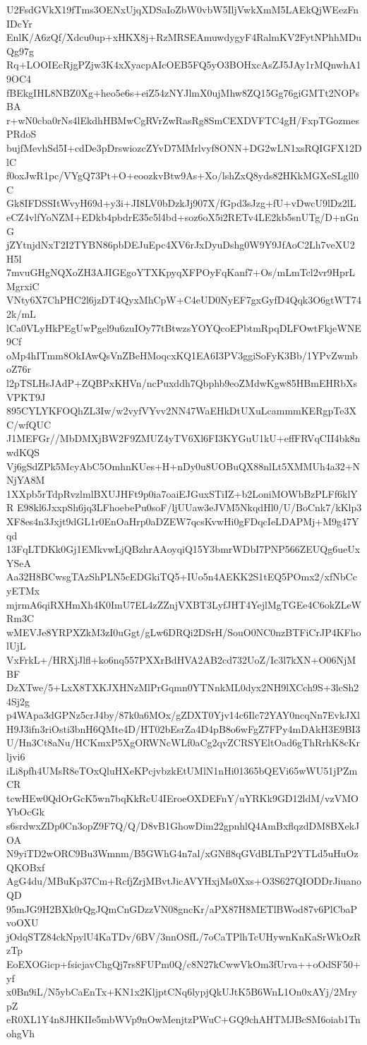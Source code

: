U2FsdGVkX19fTms3OENxUjqXDSaIoZbW0vbW5IljVwkXmM5LAEkQjWEezFnIDcYr
EnlK/A6zQf/Xdcu0up+xHKX8j+RzMRSEAmuwdygyF4RalmKV2FytNPhhMDuQg97g
Rq+LOOIEcRjgPZjw3K4xXyacpAIcOEB5FQ5yO3BOHxcAsZJ5JAy1rMQnwhA19OC4
fBEkgIHL8NBZ0Xg+heo5e6s+eiZ54zNYJlmX0ujMhw8ZQ15Gg76giGMTt2NOPsBA
r+wN0cba0rNs4lEkdhHBMwCgRVrZwRasRg8SmCEXDVFTC4gH/FxpTGozmesPRdoS
bujfMevhSd5I+cdDe3pDrswiozcZYvD7MMrlvyf8ONN+DG2wLN1xsRQIGFX12DlC
f0oxJwR1pc/VYgQ73Pt+O+eoozkvBtw9As+Xo/lshZxQ8yds82HKkMGXeSLgll0C
Gk8IFDSSItWvyH69d+y3i+JI8LV0bDzkJj907X/fGpd3sJzg+fU+vDwcU9lDz2lL
eCZ4vlfYoNZM+EDkb4pbdrE35c5l4bd+soz6oX5i2RETv4LE2kb5snUTg/D+nGnG
jZYtnjdNxT2I2TYBN86pbDEJuEpc4XV6rJxDyuDshg0W9Y9JfAoC2Lh7veXU2H5l
7mvuGHgNQXoZH3AJIGEgoYTXKpyqXFPOyFqKanf7+Os/mLmTcl2vr9HprLMgrxiC
VNty6X7ChPHC2l6jzDT4QyxMhCpW+C4eUD0NyEF7gxGyfD4Qqk3O6gtWT742k/mL
lCa0VLyHkPEgUwPgel9u6zuIOy77tBtwzsYOYQcoEPbtmRpqDLFOwtFkjeWNE9Cf
oMp4hITmm8OkIAwQsVnZBeHMoqcxKQ1EA6I3PV3ggiSoFyK3Bb/1YPvZwmboZ76r
l2pTSLHsJAdP+ZQBPxKHVn/ncPuxddh7Qbphb9eoZMdwKgw85HBmEHRbXsVPKT9J
895CYLYKFOQhZL3Iw/w2vyfVYvv2NN47WaEHkDtUXuLcammmKERgpTe3XC/wfQUC
J1MEFGr//MbDMXjBW2F9ZMUZ4yTV6Xl6FI3KYGuU1kU+effFRVqCII4bk8nwdKQS
Vj6gSdZPk5McyAbC5OmhnKUes+H+nDy0u8UOBuQX88nlLt5XMMUh4a32+NNjYA8M
1XXpb5rTdpRvzlmlBXUJHFt9p0ia7oaiEJGuxSTiIZ+b2LoniMOWbBzPLFf6klYR
E98kl6JxxpSh6jq3LFhoebePu0soF/ljUUaw3eJVM5NkqdHl0/U/BoCnk7/kKlp3
XF8es4n3Jxjt9dGL1r0EnOaHrp0aDZEW7qcsKvwHi0gFDqcIeLDAPMj+M9g47Yqd
13FqLTDKk0Gj1EMkvwLjQBzhrAAoyqiQ15Y3bmrWDbI7PNP566ZEUQg6ueUxYSeA
Aa32H8BCwsgTAzShPLN5cEDGkiTQ5+IUo5n4AEKK2S1tEQ5POmx2/xfNbCcyETMx
mjrmA6qiRXHmXh4K0ImU7EL4zZZnjVXBT3LyfJHT4YejlMgTGEe4C6okZLeWRm3C
wMEVJe8YRPXZkM3zI0uGgt/gLw6DRQi2DSrH/SouO0NC0nzBTFiCrJP4KFholUjL
VxFrkL+/HRXjJlfl+ko6nq557PXXrBdHVA2AB2cd732UoZ/Ic3l7kXN+O06NjMBF
DzXTwe/5+LxX8TXKJXHNzMlPrGqmn0YTNnkML0dyx2NH9lXCch9S+3lcSh24Sj2g
p4WApa3dGPNz5crJ4by/87k0a6MOx/gZDXT0Yjv14c6Ilc72YAY0ncqNn7EvkJXl
H9J3ifn3riOsti3bnH6QMte4D/HT02bEsrZa4D4pB8o6wFgZ7FPy4mDAkH3E9BI3
U/Hn3Ct8aNu/HCKmxP5XgORWNcWLf0aCg2qvZCRSYEltOad6gThRrhK8cKrljvi6
iLi8pfh4UMsR8eTOxQluHXeKPcjvbzkEtUMlN1nHi01365bQEVi65wWU51jPZmCR
tcwHEw0QdOrGcK5wn7bqKkRcU4IEroeOXDEFnY/uYRKk9GD12ldM/vzVMOYbOcGk
s6srdwxZDp0Cn3opZ9F7Q/Q/D8vB1GhowDim22gpnhlQ4AmBxflqzdDM8BXekJOA
N9yiTD2wORC9Bu3Wmnm/B5GWhG4n7al/xGNfl8qGVdBLTnP2YTLd5uHuOzQKOBxf
AgG4du/MBuKp37Cm+RcfjZrjMBvtJicAVYHxjMs0Xxs+O3S627QIODDrJiuanoQD
95mJG9H2BXk0rQgJQmCnGDzzVN08gncKr/aPX87H8METlBWod87v6PlCbaPvoOXU
jOdqSTZ84ckNpylU4KaTDv/6BV/3nnOSfL/7oCaTPlhTcUHywnKnKaSrWkOzRzTp
EoEXOGicp+fsicjavChgQj7rs8FUPm0Q/c8N27kCwwVkOm3fUrva++oOdSF50+yf
x0Bn9iL/N5ybCaEnTx+KN1x2KljptCNq6lypjQkUJtK5B6WnL1On0xAYj/2MrypZ
eR0XL1Y4n8JHKIIe5mbWVp9nOwMenjtzPWuC+GQ9chAHTMJBcSM6oiab1TnohgVh

